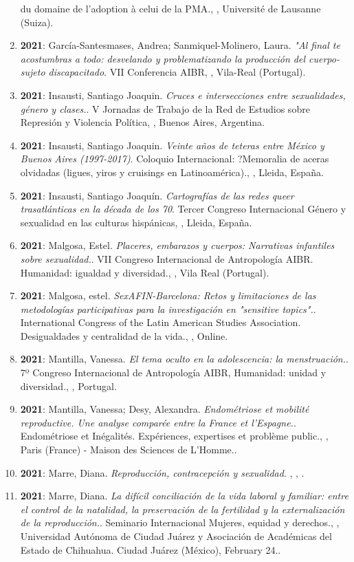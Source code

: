 \begin{enumerate}
du domaine de l’adoption à celui de la PMA., , Université de Lausanne (Suiza).\filbreak
\item {\bf 2021}: García-Santesmases, Andrea; Sanmiquel-Molinero, Laura. {\it "Al final te acostumbras a todo: desvelando y problematizando la producción del cuerpo-sujeto discapacitado}. VII Conferencia AIBR, , Vila-Real (Portugal).\filbreak
\item {\bf 2021}: Insausti, Santiago Joaquin. {\it Cruces e intersecciones entre sexualidades, género y clases.}. V Jornadas de Trabajo de la Red de Estudios sobre Represión y Violencia Política, , Buenos Aires, Argentina.\filbreak
\item {\bf 2021}: Insausti, Santiago Joaquin. {\it Veinte años de teteras entre México y Buenos Aires (1997-2017)}. Coloquio Internacional: ?Memoralia de aceras olvidadas (ligues, yiros y cruisings en Latinoamérica)., , Lleida, España.\filbreak
\item {\bf 2021}: Insausti, Santiago Joaquín. {\it Cartografías de las redes queer trasatlánticas en la década de los 70}. Tercer Congreso Internacional Género y sexualidad en las culturas hispánicas, , Lleida, España.\filbreak
\item {\bf 2021}: Malgosa, Estel. {\it Placeres, embarazos y cuerpos: Narrativas infantiles sobre sexualidad.}. VII Congreso Internacional de Antropología AIBR. Humanidad: igualdad y diversidad., , Vila Real (Portugal).\filbreak
\item {\bf 2021}: Malgosa, estel. {\it SexAFIN-Barcelona: Retos y limitaciones de las metodologías participativas para la investigación en "sensitive topics".}. International Congress of the Latin American Studies Association. Desigualdades y centralidad de la vida., , Online.\filbreak
\item {\bf 2021}: Mantilla, Vanessa. {\it El tema oculto en la adolescencia: la menstruación.}. 7º Congreso Internacional de Antropología AIBR, Humanidad: unidad y diversidad., , Portugal.\filbreak
\item {\bf 2021}: Mantilla, Vanessa; Desy, Alexandra. {\it Endométriose et mobilité reproductive. Une analyse comparée entre la France et l’Espagne.}. Endométriose et Inégalités. Expériences, expertises et problème public., , Paris (France) - Maison des Sciences de L'Homme..\filbreak
\item {\bf 2021}: Marre, Diana. {\it Reproducción, contracepción y sexualidad}. , , .\filbreak
\item {\bf 2021}: Marre, Diana. {\it La difícil conciliación de la vida laboral y familiar: entre el control de la natalidad, la preservación de la fertilidad y la externalización de la reproducción.}. Seminario Internacional Mujeres, equidad y derechos., , Universidad Autónoma de Ciudad Juárez y Asociación de Académicas del Estado de Chihuahua. Ciudad Juárez (México), February 24..\filbreak

\end{enumerate}
